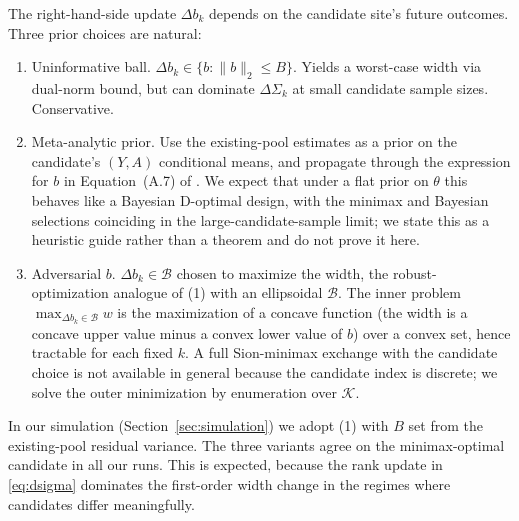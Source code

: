The right-hand-side update $\Delta b_k$ depends on the candidate site's future
outcomes. Three prior choices are natural:

\begin{enumerate}
\item Uninformative ball. $\Delta b_k \in \{b : \|b\|_2 \le B\}$. Yields
  a worst-case width via dual-norm bound, but can dominate $\Delta\Sigma_k$ at
  small candidate sample sizes. Conservative.

\item Meta-analytic prior. Use the existing-pool estimates as a prior on
  the candidate's $(Y, A)$ conditional means, and propagate through the
  expression for $b$ in Equation~(A.7) of \citet{boyarsky2026}. We expect that
  under a flat prior on $\theta$ this behaves like a Bayesian D-optimal design,
  with the minimax and Bayesian selections coinciding in the
  large-candidate-sample limit; we state this as a heuristic guide rather than a
  theorem and do not prove it here.

\item Adversarial $b$. $\Delta b_k \in \mathcal{B}$ chosen to maximize
  the width, the robust-optimization analogue of (1) with an ellipsoidal
  $\mathcal{B}$. The inner problem $\max_{\Delta b_k\in\mathcal{B}} w$ is the
  maximization of a concave function (the width is a concave upper value minus a
  convex lower value of $b$) over a convex set, hence tractable for each fixed
  $k$. A full Sion-minimax exchange with the candidate choice is not available in
  general because the candidate index is discrete; we solve the outer
  minimization by enumeration over $\mathcal{K}$.
\end{enumerate}

In our simulation (Section~\ref{sec:simulation}) we adopt (1) with $B$ set from
the existing-pool residual variance. The three variants agree on the
minimax-optimal candidate in all our runs. This is expected, because the rank
update in \eqref{eq:dsigma} dominates the first-order width change in the
regimes where candidates differ meaningfully.
